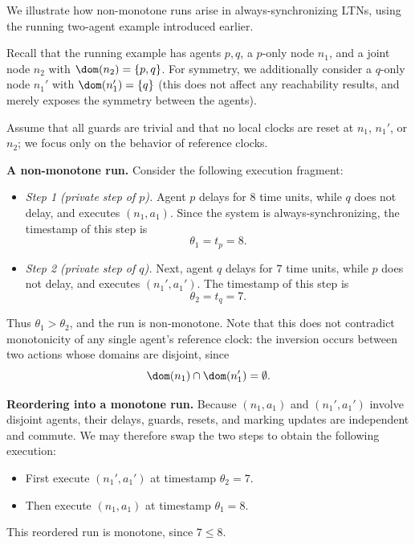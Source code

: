 \begin{example}
\label{ex:nonmonotone-running}

We illustrate how non-monotone runs arise in always-synchronizing LTNs, using the
running two-agent example introduced earlier.

Recall that the running example has agents $p,q$, a $p$-only node $n_1$, and a
joint node $n_2$ with $\dom(n_2)=\{p,q\}$. For symmetry, we additionally consider
a $q$-only node $n_1'$ with $\dom(n_1')=\{q\}$ (this does not affect any reachability
results, and merely exposes the symmetry between the agents).

Assume that all guards are trivial and that no local clocks are reset at $n_1$,
$n_1'$, or $n_2$; we focus only on the behavior of reference clocks.

\smallskip
\noindent
\textbf{A non-monotone run.}
Consider the following execution fragment:
\begin{itemize}
  \item \emph{Step 1 (private step of $p$).}
  Agent $p$ delays for $8$ time units, while $q$ does not delay, and executes
  $(n_1,a_1)$.  
  Since the system is always-synchronizing, the timestamp of this step is
  \[
  \theta_1 = t_p = 8.
  \]

  \item \emph{Step 2 (private step of $q$).}
  Next, agent $q$ delays for $7$ time units, while $p$ does not delay, and executes
  $(n_1',a_1')$.  
  The timestamp of this step is
  \[
  \theta_2 = t_q = 7.
  \]
\end{itemize}
Thus $\theta_1 > \theta_2$, and the run is non-monotone. Note that this does not
contradict monotonicity of any single agent's reference clock: the inversion
occurs between two actions whose domains are disjoint, since
\[
\dom(n_1)\cap\dom(n_1')=\emptyset.
\]

\smallskip
\noindent
\textbf{Reordering into a monotone run.}
Because $(n_1,a_1)$ and $(n_1',a_1')$ involve disjoint agents, their delays, guards,
resets, and marking updates are independent and commute. We may therefore swap the
two steps to obtain the following execution:
\begin{itemize}
  \item First execute $(n_1',a_1')$ at timestamp $\theta_2=7$.
  \item Then execute $(n_1,a_1)$ at timestamp $\theta_1=8$.
\end{itemize}
This reordered run is monotone, since $7 \le 8$.


\end{example}
